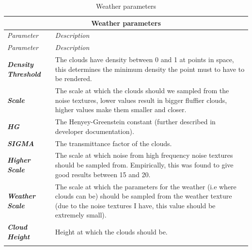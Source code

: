 \begin{center}
	\begin{longtable}{ | p{} | p{} | }
		
		\hline
		\multicolumn{2}{|c|}{\textbf{Weather parameters}}
		\\ \hline
		
		\emph{Parameter} & \emph{Description}
		\\ \hline \hline
		\endfirsthead %
		
		\hline
		\emph{Parameter} & \emph{Description}
		\\ \hline \hline
		\endhead %
	
		\hline
		\endfoot %
		
		\endlastfoot %
		
		\emph{\textbf{Density Threshold}}
		& The clouds have density between 0 and 1 at points in space, this determines the minimum density the point must to have to be rendered.
		\\ \hline
		
		\emph{\textbf{Scale}}
		& The scale at which the clouds should we sampled from the noise textures, lower values result in bigger fluffier clouds, higher values make them smaller and closer.
		\\ \hline
		
		\emph{\textbf{HG}}
		& The Henyey-Greenstein constant (further described in developer documentation).
		\\ \hline
		
		\emph{\textbf{SIGMA}}
		& The transmittance factor of the clouds.
		\\ \hline
		
		\emph{\textbf{Higher Scale}}
		& The scale at which noise from high frequency noise textures should be sampled from. Empirically, this was found to give good results between 15 and 20.
		\\ \hline
		
		\emph{\textbf{Weather Scale}}
		& The scale at which the parameters for the weather (i.e where clouds can be) should be sampled from the weather texture (due to the noise textures I have, this value should be extremely small).
		\\ \hline
		
		\emph{\textbf{Cloud Height}}
		& Height at which the clouds should be.
		\\ \hline
		
		\caption{Weather parameters}
		\label{tab:weather_params}		
	\end{longtable}
\end{center}



